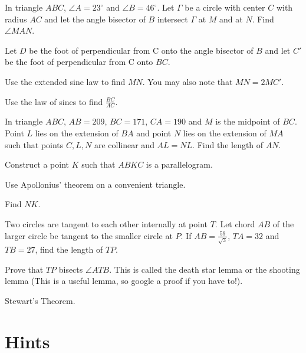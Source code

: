 \documentclass[../jarvis.tex]{subfiles}
\begin{document}
In triangle $ABC$, $\angle A=23^{\circ}$ and $\angle B=46^{\circ}$. Let $\Gamma$ be a circle with center $C$ with radius $AC$ and let the angle bisector of $B$ intersect $\Gamma$ at $M$ and at $N$. Find $\angle MAN$.
\begin{hints}
    \begin{hint}
        Let $D$ be the foot of perpendicular from C onto the angle bisector of $B$ and let $C'$ be the foot of perpendicular from C onto $BC$.
    \end{hint}
    \begin{hint}
        Use the extended sine law to find $MN$. You may also note that $MN=2MC'$.
    \end{hint}
    \begin{hint}
        Use the law of sines to find $\frac{BC}{AC}$.
    \end{hint}
\end{hints}
\problem[2019 SMO(O) P15] In triangle $ABC$, $AB=209$, $BC=171$, $CA=190$ and $M$ is the midpoint of $BC$. Point $L$ lies on the extension of $BA$ and point $N$ lies on the extension of $MA$ such that points $C,L,N$ are collinear and $AL=NL$. Find the length of $AN$.
\begin{hints}
    \begin{hint}
        Construct a point $K$ such that $ABKC$ is a parallelogram.
    \end{hint}
    \begin{hint}
        Use Apollonius' theorem on a convenient triangle.
    \end{hint}
    \begin{hint}
        Find $NK$.
    \end{hint}
\end{hints}
\problem[2019 SMO(O) P17] Two circles are tangent to each other internally at point $T$. Let chord $AB$ of the larger circle be tangent to the smaller circle at $P$. If $AB=\frac{59}{\sqrt{3}}$, $TA=32$ and $TB=27$, find the length of $TP$.
\begin{hints}
    \begin{hint}
        Prove that $TP$ bisects $\angle ATB$. This is called the death star lemma or the shooting lemma (This is a useful lemma, so google a proof if you have to!).
    \end{hint}
    \begin{hint}
        Stewart's Theorem.
    \end{hint}
\end{hints}
\section{Hints}
\printhint
\end{document}
